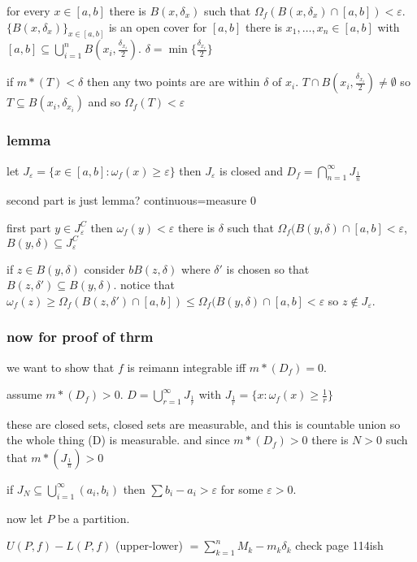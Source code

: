 \documentclass[letterpaper]{article}
\begin{document}
for every $x\in[a,b]$ there is $B(x,\delta_x)$ such that $\Omega_f(B(x,\delta_x)\cap[a,b])<\varepsilon$. $\{B(x,\delta_x)\}_{x\in[a,b]}$ is an open cover for $[a,b]$ there is $x_1,\dots,x_n\in [a,b]$ with $[a,b]\subseteq\bigcup_{i=1}^nB(x_i,\frac{\delta_{x_i}}{2})$. $\delta=\min\{\frac{\delta_{x_i}}{2}\}$

if $m*(T)<\delta$ then any two points are are within $\delta$ of $x_i$. $T\cap B(x_i,\frac{\delta_{x_i}}{2})\ne \emptyset$ so $T\subseteq B(x_i,\delta_{x_i})$ and so $\Omega_f(T)<\varepsilon$

\subsubsection*{lemma}
let $J_{\varepsilon}=\{x\in[a,b]:\omega_f(x)\ge \varepsilon\}$ then
$J_\varepsilon$ is closed and $D_f=\bigcap\limits_{n=1}^\infty J_{\frac{1}{n}}$

second part is just lemma? continuous=measure 0

first part $y\in J_{\varepsilon}^C$ then $\omega_f(y)<\varepsilon$ there is $\delta$ such that $\Omega_f(B(y,\delta)\cap[a,b]<\varepsilon$, $B(y,\delta)\subseteq J_{\varepsilon}^C$

if $z\in B(y,\delta)$ consider $bB(z,\delta)$ where $\delta'$ is chosen so that $B(z,\delta')\subseteq B(y,\delta)$. notice that $\omega_f(z)\ge \Omega_f(B(z,\delta')\cap[a,b])\le\Omega_f(B(y,\delta)\cap[a,b]<\varepsilon$ so $z\not\in J_{\varepsilon}$.

\subsubsection*{now for proof of thrm}
we want to show that $f$ is reimann integrable iff $m*(D_f)=0$.

assume $m*(D_f)>0$. $D=\bigcup_{r=1}^\infty J_{\frac{1}{r}}$ with $J_{\frac{1}{r}}=\{x:\omega_f(x)\ge\frac{1}{r}\}$

these are closed sets, closed sets are measurable, and this is countable union so the whole thing (D) is measurable. and since $m*(D_f)>0$ there is $N>0$ such that $m*(J_{\frac{1}{n}})>0$

if $J_N\subseteq\bigcup_{i=1}^\infty(a_i,b_i)$ then $\sum\limits{b_i-a_i}> \varepsilon$ for some $\varepsilon>0$. 

now let $P$ be a partition.

$U(P,f)-L(P,f)$ (upper-lower) $=\sum\limits_{k=1}^n{M_k-m_k}\delta_k$
check page 114ish
\end{document}
